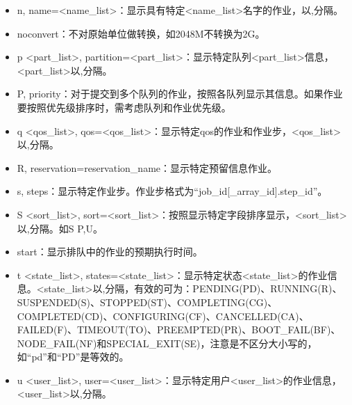 \documentclass[a4paper,12pt,english]{sphinxmanual}
\begin{document}
\begin{itemize}
\item {} 
\sphinxAtStartPar
\sphinxhyphen{}n, \sphinxhyphen{}\sphinxhyphen{}name=<name\_list>：显示具有特定<name\_list>名字的作业，以,分隔。

\item {} 
\sphinxAtStartPar
\sphinxhyphen{}\sphinxhyphen{}noconvert：不对原始单位做转换，如2048M不转换为2G。

\item {} 
\sphinxAtStartPar
\sphinxhyphen{}p <part\_list>, \sphinxhyphen{}\sphinxhyphen{}partition=<part\_list>：显示特定队列<part\_list>信息，<part\_list>以,分隔。

\item {} 
\sphinxAtStartPar
\sphinxhyphen{}P, \sphinxhyphen{}\sphinxhyphen{}priority：对于提交到多个队列的作业，按照各队列显示其信息。如果作业要按照优先级排序时，需考虑队列和作业优先级。

\item {} 
\sphinxAtStartPar
\sphinxhyphen{}q <qos\_list>, \sphinxhyphen{}\sphinxhyphen{}qos=<qos\_list>：显示特定qos的作业和作业步，<qos\_list>以,分隔。

\item {} 
\sphinxAtStartPar
\sphinxhyphen{}R, \sphinxhyphen{}\sphinxhyphen{}reservation=reservation\_name：显示特定预留信息作业。

\item {} 
\sphinxAtStartPar
\sphinxhyphen{}s, \sphinxhyphen{}\sphinxhyphen{}steps：显示特定作业步。作业步格式为“job\_id{[}\_array\_id{]}.step\_id”。

\item {} 
\sphinxAtStartPar
\sphinxhyphen{}S <sort\_list>, \sphinxhyphen{}\sphinxhyphen{}sort=<sort\_list>：按照显示特定字段排序显示，<sort\_list>以,分隔。如\sphinxhyphen{}S P,U。

\item {} 
\sphinxAtStartPar
\sphinxhyphen{}\sphinxhyphen{}start：显示排队中的作业的预期执行时间。

\item {} 
\sphinxAtStartPar
\sphinxhyphen{}t <state\_list>, \sphinxhyphen{}\sphinxhyphen{}states=<state\_list>：显示特定状态<state\_list>的作业信息。<state\_list>以,分隔，有效的可为：PENDING(PD)、RUNNING(R)、SUSPENDED(S)、STOPPED(ST)、COMPLETING(CG)、COMPLETED(CD)、CONFIGURING(CF)、CANCELLED(CA)、FAILED(F)、TIMEOUT(TO)、PREEMPTED(PR)、BOOT\_FAIL(BF)、NODE\_FAIL(NF)和SPECIAL\_EXIT(SE)，注意是不区分大小写的，如“pd”和“PD”是等效的。

\item {} 
\sphinxAtStartPar
\sphinxhyphen{}u <user\_list>, \sphinxhyphen{}\sphinxhyphen{}user=<user\_list>：显示特定用户<user\_list>的作业信息，<user\_list>以,分隔。


\end{itemize}
\end{document}
